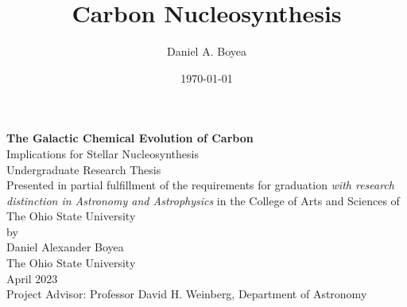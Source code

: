 \documentclass[12pt,oneside]{report}
\title{Carbon Nucleosynthesis}
\author{Daniel A. Boyea}
\date{\today}
\begin{document}


\begin{titlepage}
   \begin{center}
       \vspace*{5\baselineskip}
       \textbf{The Galactic Chemical Evolution of Carbon}\\
       Implications for Stellar Nucleosynthesis\\
       \vspace*{3\baselineskip}
        Undergraduate Research Thesis\\
       \vspace*{3\baselineskip}
    Presented in partial fulfillment of the requirements for graduation \textit{with research distinction in Astronomy and Astrophysics} in the College of Arts and Sciences of The Ohio State University\\
       \vspace*{3\baselineskip}
        by\\
       \vspace*{3\baselineskip}
       {Daniel Alexander Boyea}\\
       \vspace*{3\baselineskip}
       The Ohio State University\\
       April 2023\\
       \vspace*{3\baselineskip}
       Project Advisor: Professor David H. Weinberg, Department of Astronomy
       \vfill
   \end{center}
\end{titlepage}



\end{document}
